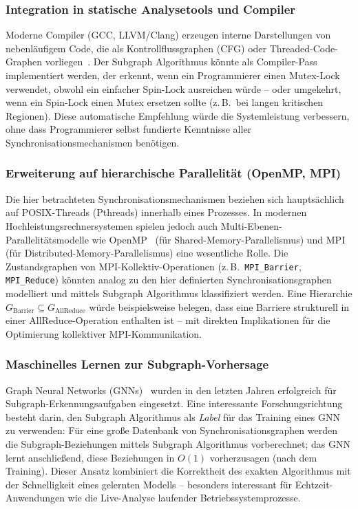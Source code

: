 ﻿\documentclass[a4paper,12pt]{article}
\theoremstyle{definition}
\begin{document}
\subsubsection{Integration in statische Analysetools und Compiler}

Moderne Compiler (GCC, LLVM/Clang) erzeugen interne Darstellungen von
nebenläufigem Code, die als Kontrollflussgraphen (CFG) oder
Threaded-Code-Graphen vorliegen~\cite{lattner2004llvm}. Der Subgraph
Algorithmus könnte als Compiler-Pass implementiert werden, der erkennt,
wenn ein Programmierer einen Mutex-Lock verwendet, obwohl ein einfacher
Spin-Lock ausreichen würde -- oder umgekehrt, wenn ein Spin-Lock
einen Mutex ersetzen sollte (z.\,B.\ bei langen kritischen Regionen).
Diese automatische Empfehlung würde die Systemleistung verbessern, ohne
dass Programmierer selbst fundierte Kenntnisse aller Synchronisations\-mechanismen
benötigen.

\subsubsection{Erweiterung auf hierarchische Parallelität (OpenMP, MPI)}

Die hier betrachteten Synchronisationsmechanismen beziehen sich
hauptsächlich auf POSIX-Threads (Pthreads) innerhalb eines Prozesses.
In modernen Hochleistungsrechnersystemen spielen jedoch auch
Multi-Ebenen-Parallelitätsmodelle wie OpenMP~\cite{openmp2011} (für
Shared-Memory-Parallelismus) und MPI~\cite{mpi2009} (für
Distributed-Memory-Parallelismus) eine wesentliche Rolle. Die
Zustandsgraphen von MPI-Kollektiv-Operationen (z.\,B.\
\texttt{MPI\_Barrier}, \texttt{MPI\_Reduce}) könnten analog zu den
hier definierten Synchronisationsgraphen modelliert und mittels
Subgraph Algorithmus klassifiziert werden. Eine Hierarchie
$G_{\mathrm{Barrier}} \subseteq G_{\mathrm{AllReduce}}$ würde
beispielsweise belegen, dass eine Barriere strukturell in einer
AllReduce-Operation enthalten ist -- mit direkten Implikationen für
die Optimierung kollektiver MPI-Kommunikation.

\subsubsection{Maschinelles Lernen zur Subgraph-Vorhersage}

Graph Neural Networks (GNNs)~\cite{scarselli2009graph} wurden in den
letzten Jahren erfolgreich für Subgraph-Erkennungsaufgaben eingesetzt.
Eine interessante Forschungsrichtung besteht darin, den Subgraph Algorithmus
als \emph{Label} für das Training eines GNN zu verwenden: Für eine große
Datenbank von Synchronisationsgraphen werden die Subgraph-Beziehungen
mittels Subgraph Algorithmus vorberechnet; das GNN lernt anschließend, diese
Beziehungen in $O(1)$ vorherzusagen (nach dem Training).
Dieser Ansatz kombiniert die Korrektheit des exakten Algorithmus mit der
Schnelligkeit eines gelernten Modells -- besonders interessant für
Echtzeit-Anwendungen wie die Live-Analyse laufender Betriebssystem\-prozesse.
\end{document}
